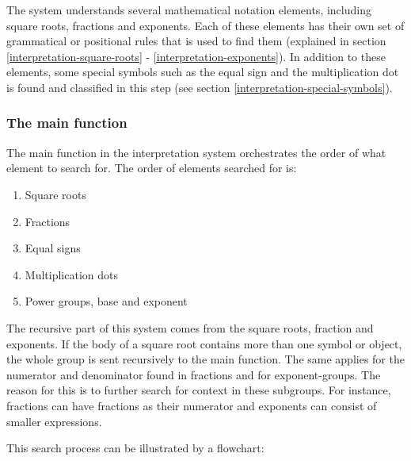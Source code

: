 
The system understands several mathematical notation elements, including square roots, fractions and exponents. Each of these elements has their own set of grammatical or positional rules that is used to find them (explained in section \ref{interpretation-square-roots} - \ref{interpretation-exponents}). In addition to these elements, some special symbols such as the equal sign and the multiplication dot is found and classified in this step (see section \ref{interpretation-special-symbols}).

\subsubsection{The main function}
The main function in the interpretation system orchestrates the order of what element to search for. The order of elements searched for is:

\begin{enumerate}
    \setlength\itemsep{0.3em}
    \item Square roots
    \item Fractions
    \item Equal signs
    \item Multiplication dots
    \item Power groups, base and exponent
\end{enumerate}

The recursive part of this system comes from the square roots, fraction and exponents. If the body of a square root contains more than one symbol or object, the whole group is sent recursively to the main function. The same applies for the numerator and denominator found in fractions and for exponent-groups. The reason for this is to further search for context in these subgroups. For instance, fractions can have fractions as their numerator and exponents can consist of smaller expressions. 

This search process can be illustrated by a flowchart:


